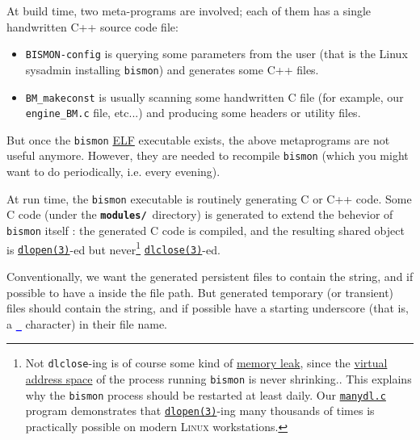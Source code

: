 \begin{appendices}
At build time, two meta-programs are involved; each of them has a
single handwritten C++ source code file:

\begin{itemize}
  \item \texttt{BISMON-config}
     is
    querying some parameters from the user (that is the Linux sysadmin
    installing \texttt{bismon}) and generates some C++ files.

  \item \texttt{BM\_makeconst}
     is usually
    scanning some handwritten C file (for example, our
    \texttt{engine\_BM.c} file, etc...)  and producing some headers or
    utility files.
\end{itemize}

But once the \texttt{bismon}
\href{https://en.wikipedia.org/wiki/Executable_and_Linkable_Format}{ELF}
executable exists, the above metaprograms are not useful
anymore. However, they are needed to recompile \texttt{bismon} (which
you might want to do periodically, i.e. every evening).

\medskip

At run time, the \texttt{bismon} executable is routinely generating C
or C++ code. Some C code (under the \textbf{\texttt{modules/}}\,
directory) is generated to extend the behevior of \texttt{bismon}
itself : the generated C code is compiled, and the resulting shared
object is
\href{https://man7.org/linux/man-pages/man3/dlopen.3.html}{\texttt{dlopen(3)}}-ed
but never\footnote{Not \texttt{dlclose}-ing is of course some kind of
\href{https://en.wikipedia.org/wiki/Memory_leak}{memory leak}, since
the \href{https://en.wikipedia.org/wiki/Virtual_address_space}{virtual
  address space} of the process running \texttt{bismon} is never
shrinking.. This explains why the \texttt{bismon} process should be
restarted at least daily.  Our
\href{https://github.com/bstarynk/misc-basile/blob/master/manydl.c}{\texttt{manydl.c}}
program demonstrates that
\href{https://man7.org/linux/man-pages/man3/dlopen.3.html}{\texttt{dlopen(3)}}-ing
many thousands of times is practically possible on modern
\textsc{Linux} workstations.}
\href{https://man7.org/linux/man-pages/man3/dlclose.3.html}{\texttt{dlclose(3)}}-ed.

  Conventionally, we
want the generated persistent files to contain the
\texttt{\textsection} string, and
if possible to have a \texttt{\textsection} inside the file path.  But
generated temporary (or transient) files should contain the
\texttt{\textcurrency} string, and if possible
 have
a starting underscore (that is, a
\textcolor{blue}{\large\textbf{\texttt{\_}}} character) in their file
name.


\end{appendices}
